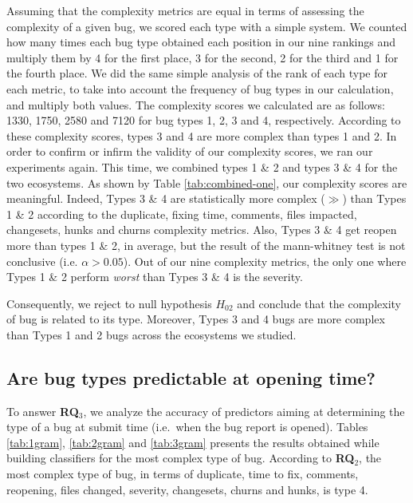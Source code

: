 \documentclass[natbib]{svjour3}
\begin{document}
Assuming that the complexity metrics are equal in terms of assessing the
complexity of a given bug, we scored each type with a simple system. We
counted how many times each bug type obtained each position in our nine
rankings and multiply them by 4 for the first place, 3 for the second, 2
for the third and 1 for the fourth place. We did the same simple
analysis of the rank of each type for each metric, to take into account
the frequency of bug types in our calculation, and multiply both values.
The complexity scores we calculated are as follows: 1330, 1750, 2580 and
7120 for bug types 1, 2, 3 and 4, respectively. According to these
complexity scores, types 3 and 4 are more complex than types 1 and 2. In
order to confirm or infirm the validity of our complexity scores, we ran
our experiments again. This time, we combined types 1 \& 2 and types 3
\& 4 for the two ecosystems. As shown by Table \ref{tab:combined-one},
our complexity scores are meaningful. Indeed, Types 3 \& 4 are
statistically more complex (\(\gg\)) than Types 1 \& 2 according to the
duplicate, fixing time, comments, files impacted, changesets, hunks and
churns complexity metrics. Also, Types 3 \& 4 get reopen more than types
1 \& 2, in average, but the result of the mann-whitney test is not
conclusive (i.e. \(\alpha>0.05\)). Out of our nine complexity metrics,
the only one where Types 1 \& 2 perform \emph{worst} than Types 3 \& 4
is the severity.

Consequently, we reject to null hypothesis \(H_{02}\) and conclude that
the complexity of bug is related to its type. Moreover, Types 3 and 4
bugs are more complex than Types 1 and 2 bugs across the ecosystems we
studied.

\subsection{Are bug types predictable at opening
time?}\label{are-bug-types-predictable-at-opening-time-1}

To answer \textbf{RQ\(_3\)}, we analyze the accuracy of predictors
aiming at determining the type of a bug at submit time (i.e.~when the
bug report is opened). Tables \ref{tab:1gram}, \ref{tab:2gram} and
\ref{tab:3gram} presents the results obtained while building classifiers
for the most complex type of bug. According to \textbf{RQ\(_2\)}, the
most complex type of bug, in terms of duplicate, time to fix, comments,
reopening, files changed, severity, changesets, churns and hunks, is
type 4.
\end{document}
